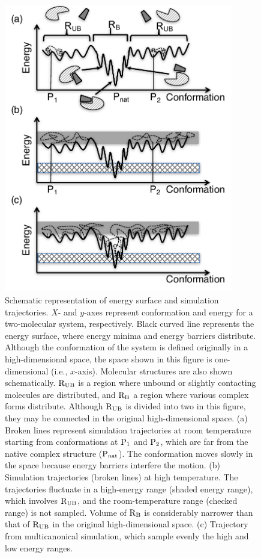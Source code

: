 \begin{figure}
  \centering
  \includegraphics[width=10cm]{../enhance_rev/figures/ene_landscape.pdf}
  \caption{\label{fig:ene_landscape.pdf} Schematic representation of energy surface and simulation trajectories.
$X$- and $y$-axes represent conformation and energy for a two-molecular system,
respectively. Black curved line represents the energy surface, where energy minima and energy barriers distribute. Although the conformation of the system is defined originally in a high-dimensional space, the space shown in this figure is one-dimensional (i.e., $x$-axis). Molecular structures are also shown schematically. $\rm R_{\rm UB}$ is a region where unbound or slightly contacting molecules are distributed, and $\rm R_{\rm B}$ a region where various complex forms distribute. Although $\rm R_{\rm UB}$  is divided into two in this figure, they may be connected in the original high-dimensional space. (a) Broken lines represent simulation trajectories at room temperature starting from conformations at $\rm P_1$ and $\rm P_2$, which are far from the native complex structure ($\rm P_{\rm nat}$). The conformation moves slowly in the space because energy barriers interfere the motion. (b) Simulation trajectories (broken lines) at high temperature. The trajectories fluctuate in a high-energy range (shaded energy range), which involves $\rm R_{\rm UB}$, and the room-temperature range (checked range) is not sampled. Volume of $\rm R_{\rm B}$ is considerably narrower than that of $\rm R_{\rm UB}$ in the original high-dimensional space. (c) Trajectory from multicanonical simulation, which sample evenly the high and low energy ranges.}
\end{figure}

